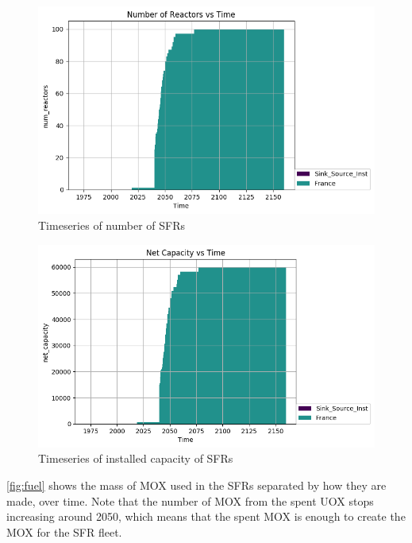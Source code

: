 \begin{figure}[htbp!]
	\begin{center}
		\includegraphics{./images/number_plot.png}
	\end{center}
	\caption{Timeseries of number of \gls{SFR}s}
	\label{fig:sfr_num}
\end{figure}

\begin{figure}[htbp!]
	\begin{center}
		\includegraphics{./images/power_plot.png}
	\end{center}
	\caption{Timeseries of installed capacity of \gls{SFR}s}
	\label{fig:sfr_cap}
\end{figure}

\ref{fig:fuel} shows the mass of \gls{MOX} used in the 
\gls{SFR}s separated by how they are made, over time.
Note that the number of \gls{MOX} from the spent \gls{UOX}
stops increasing around 2050, which means that the spent
\gls{MOX} is enough to create the \gls{MOX} for the
\gls{SFR} fleet. 

